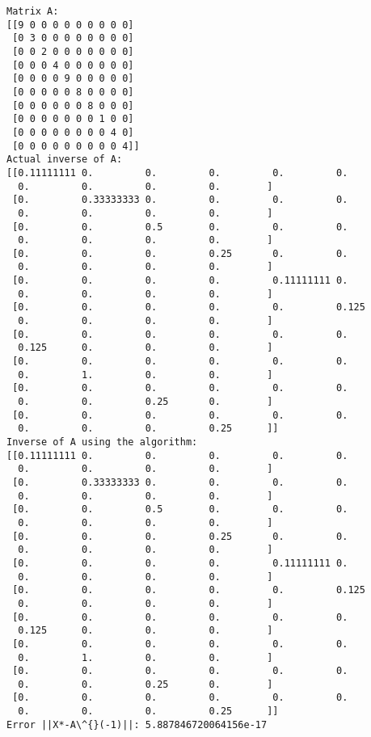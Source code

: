 \documentclass[11pt]{article}
\begin{document}
    \begin{Verbatim}[commandchars=\\\{\}]
Matrix A:
[[9 0 0 0 0 0 0 0 0 0]
 [0 3 0 0 0 0 0 0 0 0]
 [0 0 2 0 0 0 0 0 0 0]
 [0 0 0 4 0 0 0 0 0 0]
 [0 0 0 0 9 0 0 0 0 0]
 [0 0 0 0 0 8 0 0 0 0]
 [0 0 0 0 0 0 8 0 0 0]
 [0 0 0 0 0 0 0 1 0 0]
 [0 0 0 0 0 0 0 0 4 0]
 [0 0 0 0 0 0 0 0 0 4]]
Actual inverse of A:
[[0.11111111 0.         0.         0.         0.         0.
  0.         0.         0.         0.        ]
 [0.         0.33333333 0.         0.         0.         0.
  0.         0.         0.         0.        ]
 [0.         0.         0.5        0.         0.         0.
  0.         0.         0.         0.        ]
 [0.         0.         0.         0.25       0.         0.
  0.         0.         0.         0.        ]
 [0.         0.         0.         0.         0.11111111 0.
  0.         0.         0.         0.        ]
 [0.         0.         0.         0.         0.         0.125
  0.         0.         0.         0.        ]
 [0.         0.         0.         0.         0.         0.
  0.125      0.         0.         0.        ]
 [0.         0.         0.         0.         0.         0.
  0.         1.         0.         0.        ]
 [0.         0.         0.         0.         0.         0.
  0.         0.         0.25       0.        ]
 [0.         0.         0.         0.         0.         0.
  0.         0.         0.         0.25      ]]
Inverse of A using the algorithm:
[[0.11111111 0.         0.         0.         0.         0.
  0.         0.         0.         0.        ]
 [0.         0.33333333 0.         0.         0.         0.
  0.         0.         0.         0.        ]
 [0.         0.         0.5        0.         0.         0.
  0.         0.         0.         0.        ]
 [0.         0.         0.         0.25       0.         0.
  0.         0.         0.         0.        ]
 [0.         0.         0.         0.         0.11111111 0.
  0.         0.         0.         0.        ]
 [0.         0.         0.         0.         0.         0.125
  0.         0.         0.         0.        ]
 [0.         0.         0.         0.         0.         0.
  0.125      0.         0.         0.        ]
 [0.         0.         0.         0.         0.         0.
  0.         1.         0.         0.        ]
 [0.         0.         0.         0.         0.         0.
  0.         0.         0.25       0.        ]
 [0.         0.         0.         0.         0.         0.
  0.         0.         0.         0.25      ]]
Error ||X*-A\^{}(-1)||: 5.887846720064156e-17

\end{Verbatim}
\end{document}
